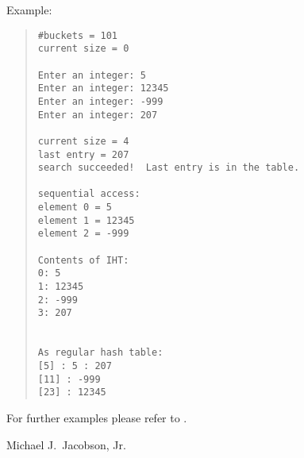 Example:
\begin{quote}
\begin{verbatim}
#buckets = 101
current size = 0

Enter an integer: 5
Enter an integer: 12345
Enter an integer: -999
Enter an integer: 207

current size = 4
last entry = 207
search succeeded!  Last entry is in the table.

sequential access:
element 0 = 5
element 1 = 12345
element 2 = -999

Contents of IHT:
0: 5
1: 12345
2: -999
3: 207


As regular hash table:
[5] : 5 : 207
[11] : -999
[23] : 12345
\end{verbatim}
\end{quote}

For further examples please refer to
.



\AUTHOR

Michael J.~Jacobson, Jr.

